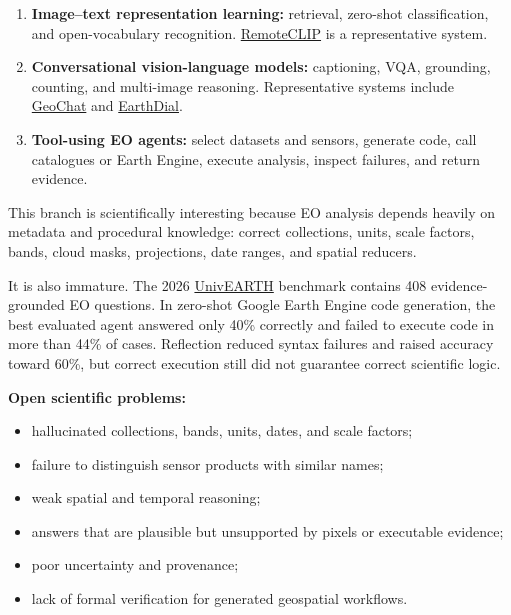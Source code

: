 \documentclass[
  a4paper,
  11pt]{article}
\providecommand{\tightlist}{%
  \setlength{\itemsep}{0pt}\setlength{\parskip}{0pt}}
\begin{document}
\begin{enumerate}
\def\labelenumi{\arabic{enumi}.}
\tightlist
\item
  \textbf{Image--text representation learning:} retrieval, zero-shot
  classification, and open-vocabulary recognition.
  \href{https://arxiv.org/abs/2306.11029}{RemoteCLIP} is a
  representative system.
\item
  \textbf{Conversational vision-language models:} captioning, VQA,
  grounding, counting, and multi-image reasoning. Representative systems
  include
  \href{https://openaccess.thecvf.com/content/CVPR2024/html/Kuckreja_GeoChat_Grounded_Large_Vision-Language_Model_for_Remote_Sensing_CVPR_2024_paper.html}{GeoChat}
  and \href{https://arxiv.org/abs/2412.15190}{EarthDial}.
\item
  \textbf{Tool-using EO agents:} select datasets and sensors, generate
  code, call catalogues or Earth Engine, execute analysis, inspect
  failures, and return evidence.
\end{enumerate}

This branch is scientifically interesting because EO analysis depends
heavily on metadata and procedural knowledge: correct collections,
units, scale factors, bands, cloud masks, projections, date ranges, and
spatial reducers.

It is also immature. The 2026
\href{https://aclanthology.org/2026.findings-acl.124.pdf}{UnivEARTH}
benchmark contains 408 evidence-grounded EO questions. In zero-shot
Google Earth Engine code generation, the best evaluated agent answered
only 40\% correctly and failed to execute code in more than 44\% of
cases. Reflection reduced syntax failures and raised accuracy toward
60\%, but correct execution still did not guarantee correct scientific
logic.

\textbf{Open scientific problems:}

\begin{itemize}
\tightlist
\item
  hallucinated collections, bands, units, dates, and scale factors;
\item
  failure to distinguish sensor products with similar names;
\item
  weak spatial and temporal reasoning;
\item
  answers that are plausible but unsupported by pixels or executable
  evidence;
\item
  poor uncertainty and provenance;
\item
  lack of formal verification for generated geospatial workflows.
\end{itemize}
\end{document}

